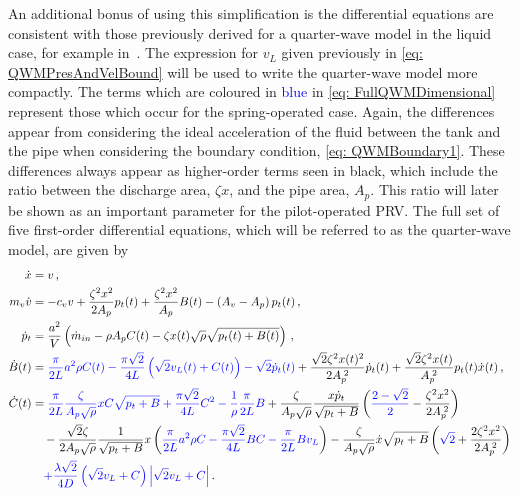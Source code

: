 An additional bonus of using this simplification is the differential equations are consistent with those previously derived for a quarter-wave model in the liquid case, for example in~\cite{Hos2015ModelPipe}. The expression for $v_L$ given previously in \cref{eq: QWMPresAndVelBound} will be used to write the quarter-wave model more compactly. The terms which are coloured in \textcolor{Blue}{blue} in \cref{eq: FullQWMDimensional} represent those which occur for the spring-operated case. Again, the differences appear from considering the ideal acceleration of the fluid between the tank and the pipe when considering the boundary condition, \cref{eq: QWMBoundary1}. These differences always appear as higher-order terms seen in black, which include the ratio between the discharge area, $\zeta x$, and the pipe area, $A_p$. This ratio will later be shown as an important parameter for the pilot-operated PRV. The full set of five first-order differential equations, which will be referred to as the quarter-wave model, are given by
~
\begin{equation} \label{eq: FullQWMDimensional}
\begin{split}
    \dot{x} &= v \, , \\
    m_v \dot{v} &= - c_v v + \frac{\zeta^2 x^2}{2 A_p} p_t(t) + \frac{\zeta^2 x^2}{A_p} B(t) - \left( A_v - A_p \right) p_t(t)
    \, , \\
    \dot{p}_t &= \frac{a^2}{V} \left( \dot{m}_{in} - \rho A_p C(t) - \zeta x(t) \sqrt{\rho} \sqrt{p_t(t) + B(t)} \right)
    \, , \\
    \dot{B}(t) &= \textcolor{Blue}{
    \frac{\pi}{2L} a^2 \rho C(t) - \frac{\pi \sqrt{2}}{4L} \left( \sqrt{2} v_L(t) + C(t) \right) - \sqrt{2} \dot{p}_t(t)} + \frac{\sqrt{2} \zeta^2 x(t)^2}{2 A_p\power{2}} \dot{p}_t(t) + \frac{\sqrt{2} \zeta^2 x(t)}{A_p\power{2}} p_t(t) \dot{x}(t)
    \, , \\
    \dot{C}(t) &=
    \textcolor{Blue}{
    \frac{\pi}{2L} \frac{\zeta}{A_p \sqrt{\rho}} x C \sqrt{p_t + B}
    + \frac{\pi \sqrt{2}}{4 L} C^2
    - \frac{1}{\rho} \frac{\pi}{2L} B
    }
    + \frac{\zeta}{A_p \sqrt{\rho}} \frac{x \dot{p}_t}{\sqrt{p_t+B}} \left( 
    \textcolor{Blue}{\frac{2 - \sqrt{2}}{2}} -
    \frac{\zeta^2 x^2}{2 A_p\power{2}} \right)
    \\ & \quad %
    - \frac{\sqrt{2} \zeta}{2 A_p \sqrt{\rho}} \frac{1}{\sqrt{p_t+B}} x \left(
    \textcolor{Blue}{
    \frac{\pi}{2L} a^2 \rho C
    - \frac{\pi \sqrt{2}}{4 L} B C
    - \frac{\pi}{2L} B v_L }
    \right)
    - \frac{\zeta}{A_p \sqrt{\rho}} \dot{x} \sqrt{p_t + B} \left( 
    \textcolor{Blue}{\sqrt{2}} +
    \frac{2 \zeta^2 x^2}{2 A_p\power{2}}
    \right)
    \\ & \quad %
    \textcolor{Blue}{
    + \frac{\lambda \sqrt{2}}{4 D} \left( \sqrt{2} v_L + C \right) \left| \sqrt{2} v_L + C \right| }
    \, .
\end{split}
\end{equation}

